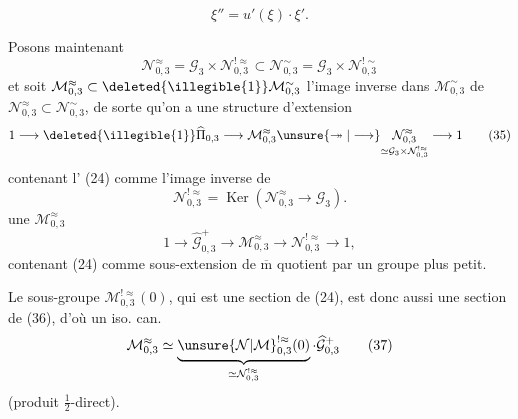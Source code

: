 
\[
\xi''=u'(\xi)\cdot\xi'.
\tag{33}
\]

Posons maintenant
\[
\mathcal N_{0,3}^{\approx}
=\mathcal G_3\times\mathcal N_{0,3}^{!\approx}
\subset\mathcal N_{0,3}^{\sim}
=\mathcal G_3\times\mathcal N_{0,3}^{!\sim}
\tag{34}
\]
et soit $\mathcal M_{0,3}^{\approx}\subset\deleted{\illegible{1}}\mathcal M_{0,3}^{\sim}$ l'image inverse dans $\mathcal M_{0,3}^{\sim}$ de $\mathcal N_{0,3}^{\approx}\subset\mathcal N_{0,3}^{\sim}$, de sorte qu'on a une structure d'extension
\[
1\longrightarrow\deleted{\illegible{1}}\widehat\Pi_{0,3}
\longrightarrow\mathcal M_{0,3}^{\approx}
\unsure{\twoheadrightarrow|\longrightarrow}
\underset{\simeq\mathcal G_3\times\mathcal N_{0,3}^{!\approx}}{\mathcal N_{0,3}^{\approx}}
\longrightarrow1
\tag{35}
\]
contenant l' (24) comme l'image inverse de 
\[
\mathcal N_{0,3}^{!\approx}
=\operatorname{Ker}(\mathcal N_{0,3}^{\approx}\longrightarrow\mathcal G_3).
\]
   une   $\mathcal M_{0,3}^{\approx}$
\[
1\longrightarrow\widehat{\mathcal G}_{0,3}^{+}
\longrightarrow\mathcal M_{0,3}^{\approx}
\longrightarrow\mathcal N_{0,3}^{!\approx}\longrightarrow1,
\tag{36}
\]
contenant (24) comme sous-extension de $\overline{\mathrm m}$ quotient par un groupe plus petit.

Le sous-groupe $\mathcal M_{0,3}^{!\approx}(0)$, qui est une section de (24), est donc aussi une section de (36), d'où un iso. can.
\[
\mathcal M_{0,3}^{\approx}
\simeq\underbrace{\unsure{\mathcal N|\mathcal M}_{0,3}^{!\approx}(0)}_{\simeq\mathcal N_{0,3}^{!\approx}}
\cdot\widehat{\mathcal G}_{0,3}^{+}
\tag{37}
\]
(produit $\frac12$-direct).


